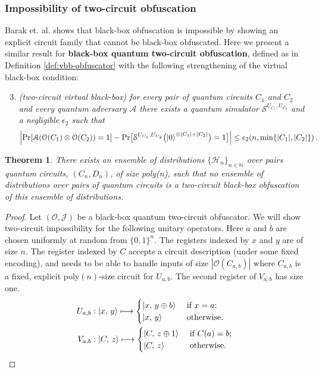 \documentclass[11pt]{article}
\numberwithin{equation}{section}
\newtheorem{theorem}{Theorem}
\newcommand{\algo}{\mathcal}
\begin{document}
{\subsubsection{Impossibility of two-circuit obfuscation}\label{sec-twocircuit}
Barak et. al. \cite{BGIRSVY12} shows that black-box obfuscation is impossible by showing an explicit circuit family that cannot be black-box obfuscated.  Here we present a similar result for {\bf black-box quantum two-circuit obfuscation},  defined as in Definition \ref{def:vbb-obfuscator}  with the following strengthening of the virtual black-box condition:
\begin{enumerate}
\setcounter{enumi}{2}
\item \emph{(two-circuit virtual black-box) for every pair of quantum circuits $C_1$ and $C_2$ and every quantum adversary $\mathcal A$ there exists a quantum simulator $\mathcal S^{U_{C_1}, U_{C_2}}$ and a negligible $\epsilon_2$ such that}
$$
\Bigl| \text{Pr}[\mathcal A(\mathcal O(C_1) \otimes \mathcal O(C_2)) = 1] - \text{Pr}\bigl[\mathcal S^{U_{C_1}, U_{C_2}}\bigl({\left\vert{0}\right\rangle}^{\otimes |C_1| + |C_2|}\bigr) = 1\bigr] \Bigr| \leq \epsilon_2(n, \min\{|C_1|,|C_2|\})\,.
$$
\end{enumerate}
\begin{theorem}
There exists an ensemble of distributions $\lbrace\mathcal{H}_n\rbrace_{n\in\mathbb{N}}$ over pairs quantum circuits, $(C_n, D_n)$, of size poly(n), such that no ensemble of distributions over pairs of quantum circuits is a two-circuit black-box obfuscation of this ensemble of distributions.
\end{theorem}
\begin{proof}
Let $(\mathcal O, \mathcal J)$ be a black-box quantum two-circuit obfuscator. 
We will show two-circuit impossibility for the following unitary operators. Here $a$ and $b$ are chosen uniformly at random from $\{0,1\}^n$.  The registers indexed by $x$ and $y$ are of size $n$. The register indexed by $C$ accepts a circuit description (under some fixed encoding), and needs to be able to handle inputs of size $|\algo O(C_{a, b})|$ where $C_{a, b}$ is a fixed, explicit poly$(n)$-size circuit for $U_{a, b}$. The second register of $V_{a, b}$ has size one.
\begin{align}\label{eq:pair-impossible}
U_{a, b} &: {\left\vert{x,\, y}\right\rangle} \longmapsto
\begin{cases}
{\left\vert{x,\, y \oplus b}\right\rangle} &\text{ if } x = a;\\
{\left\vert{x,\, y}\right\rangle} &\text{ otherwise}.
\end{cases}\\
V_{a, b} &: {\left\vert{C,\, z}\right\rangle} \longmapsto
\begin{cases}
{\left\vert{C,\, z \oplus 1}\right\rangle} &\text{ if } C(a) = b;\\
{\left\vert{C,\, z}\right\rangle} &\text{ otherwise}.
\end{cases}
\end{align}


\end{proof}}
\end{document}
